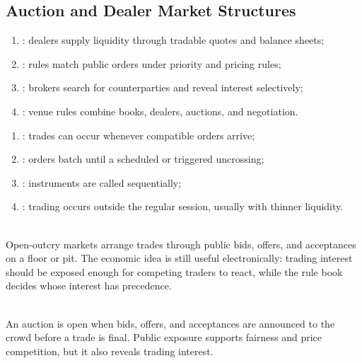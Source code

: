\subsection{Auction and Dealer Market Structures}

\begin{taxonomy} 
\begin{enumerate}[label=\roman*.]
\setlength{\itemsep}{0pt}
\item {}: dealers supply liquidity through tradable quotes and balance sheets;
\item {}: rules match public orders under priority and pricing rules;
\item {}: brokers search for counterparties and reveal interest selectively;
\item {}: venue rules combine books, dealers, auctions, and negotiation.
\end{enumerate}
\end{taxonomy}

\begin{taxonomy} 
\begin{enumerate}[label=\roman*.]
\setlength{\itemsep}{0pt}
\item {}: trades can occur whenever compatible orders arrive;
\item {}: orders batch until a scheduled or triggered uncrossing;
\item {}: instruments are called sequentially;
\item {}: trading occurs outside the regular session, usually with thinner liquidity.
\end{enumerate}
\end{taxonomy}

\begin{mechanism} \\
Open-outcry markets arrange trades through public bids, offers, and acceptances on a floor or pit. The economic idea is still useful electronically: trading interest should be exposed enough for competing traders to react, while the rule book decides whose interest has precedence.
\end{mechanism}

\begin{marketrule} \\
An auction is open when bids, offers, and acceptances are announced to the crowd before a trade is final. Public exposure supports fairness and price competition, but it also reveals trading interest.
\end{marketrule}

